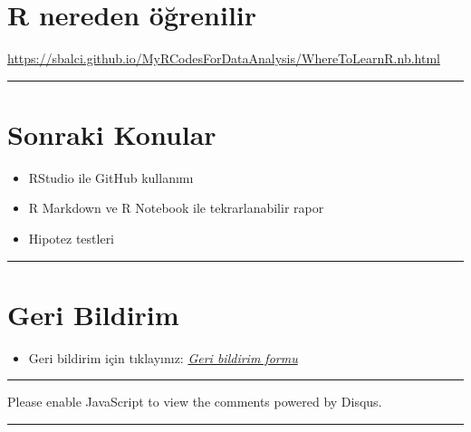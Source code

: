\documentclass[]{article}
\providecommand{\tightlist}{%
  \setlength{\itemsep}{0pt}\setlength{\parskip}{0pt}}
\begin{document}
\hypertarget{r-nereden-ogrenilir}{%
\section{R nereden öğrenilir}\label{r-nereden-ogrenilir}}

\url{https://sbalci.github.io/MyRCodesForDataAnalysis/WhereToLearnR.nb.html}

\begin{center}\rule{0.5\linewidth}{\linethickness}\end{center}

\hypertarget{sonraki-konular}{%
\section{Sonraki Konular}\label{sonraki-konular}}

\begin{itemize}
\tightlist
\item
  RStudio ile GitHub kullanımı
\item
  R Markdown ve R Notebook ile tekrarlanabilir rapor
\item
  Hipotez testleri
\end{itemize}

\begin{center}\rule{0.5\linewidth}{\linethickness}\end{center}

\hypertarget{geri-bildirim}{%
\section{Geri Bildirim}\label{geri-bildirim}}

\begin{itemize}
\tightlist
\item
  Geri bildirim için tıklayınız:
  \emph{\href{https://goo.gl/forms/YjGZ5DHgtPlR1RnB3}{Geri bildirim
  formu}}
\end{itemize}

\begin{center}\rule{0.5\linewidth}{\linethickness}\end{center}

\hypertarget{disqus_thread}{}

Please enable JavaScript to view the comments powered by Disqus.

\begin{center}\rule{0.5\linewidth}{\linethickness}\end{center}
\end{document}

